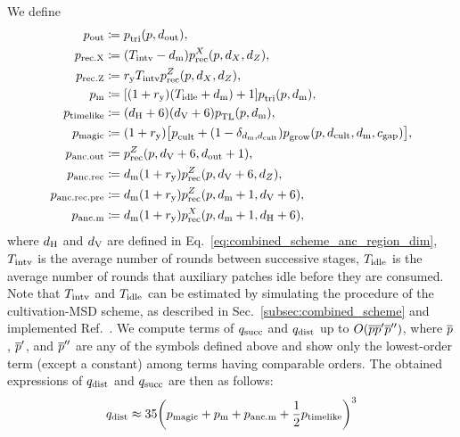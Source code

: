 \documentclass[
 prx,
 reprint,
 superscriptaddress,
 longbibliography,
 dvipsnames
]{revtex4-2}
\begin{document}
\begin{widetext}
We define
\begin{align*}
    p_{\mathrm{out}} &\coloneqq p_{\mathrm{tri}}^{}(p, d_{\mathrm{out}}), \\
    p_{\mathrm{rec.X}} &\coloneqq (T_{\mathrm{intv}} - d_{\mathrm{m}}) p_{\mathrm{rec}}^{X}(p, {d_X}, {d_Z}), \\
    p_{\mathrm{rec.Z}} &\coloneqq r_{\mathrm{y}} T_{\mathrm{intv}} p_{\mathrm{rec}}^{Z}(p, {d_X}, {d_Z}), \\
    p_{\mathrm{m}} &\coloneqq \qty[(1 + r_{\mathrm{y}})(T_{\mathrm{idle}} + d_{\mathrm{m}}) + 1] p_{\mathrm{tri}}^{}(p, d_{\mathrm{m}}), \\
    p_{\mathrm{timelike}} &\coloneqq (d_{\mathrm{H}} + 6)(d_{\mathrm{V}} + 6) p_{\mathrm{TL}}^{}(p, d_{\mathrm{m}}), \\
    p_{\mathrm{magic}} &\coloneqq (1 + r_{\mathrm{y}}) \qty[p_{\mathrm{cult}}^{} + \qty(1 - \delta_{d_{\mathrm{m}}, d_\mathrm{cult}}) p_{\mathrm{grow}}^{} (p, d_\mathrm{cult}, d_{\mathrm{m}}, c_{\mathrm{gap}})], \\
    p_{\mathrm{anc.out}} &\coloneqq p_{\mathrm{rec}}^{Z}(p, d_{\mathrm{V}} + 6, d_{\mathrm{out}} + 1), \\
    p_{\mathrm{anc.rec}} &\coloneqq d_{\mathrm{m}}(1 + r_{\mathrm{y}})p_{\mathrm{rec}}^{Z}(p, d_{\mathrm{V}} + 6, {d_Z}), \\
    p_{\mathrm{anc.rec.pre}} &\coloneqq d_{\mathrm{m}}(1 + r_{\mathrm{y}})p_{\mathrm{rec}}^{Z}(p, d_{\mathrm{m}} + 1, d_{\mathrm{V}} + 6), \\
    p_{\mathrm{anc.m}} &\coloneqq d_{\mathrm{m}}(1 + r_{\mathrm{y}}) p_{\mathrm{rec}}^{X}(p, d_{\mathrm{m}} + 1, d_{\mathrm{H}} + 6),
\end{align*}
where $d_{\mathrm{H}}$ and $d_{\mathrm{V}}$ are defined in Eq.~\eqref{eq:combined_scheme_anc_region_dim}, $T_{\mathrm{intv}}$ is the average number of rounds between successive stages, $T_{\mathrm{idle}}$ is the average number of rounds that auxiliary patches idle before they are consumed.
Note that $T_{\mathrm{intv}}$ and $T_{\mathrm{idle}}$ can be estimated by simulating the procedure of the cultivation-MSD scheme, as described in Sec.~\ref{subsec:combined_scheme} and implemented Ref.~\cite{github:msd-magic-state-prep-cycle-simulation}.
We compute terms of $q_{\mathrm{succ}}$ and $q_{\mathrm{dist}}$ up to $O(\overline{p}\overline{p}'\overline{p}'')$, where $\overline{p}$, $\overline{p}'$, and $\overline{p}''$ are any of the symbols defined above and show only the lowest-order term (except a constant) among terms having comparable orders.
The obtained expressions of $q_{\mathrm{dist}}$ and $q_{\mathrm{succ}}$ are then as follows:
\begin{align*}
    \infidMSD \approx{}& 35 \qty(p_\mr{magic} + p_\mr{m} + p_\mr{anc.m} + \frac{1}{2} p_\mr{timelike})^3 \\

\end{align*}
\end{widetext}
\end{document}
